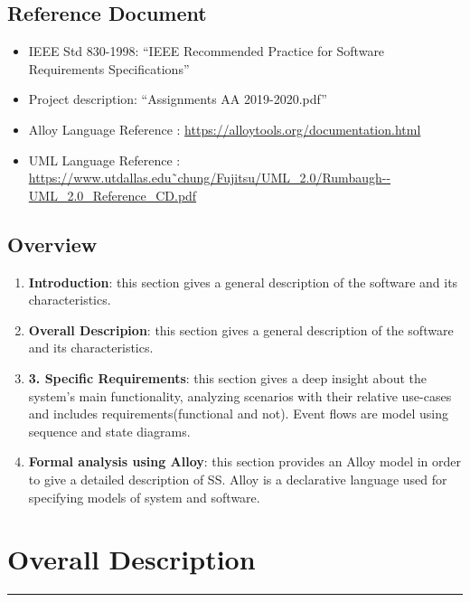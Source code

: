 \documentclass[12pt]{article}
\begin{document}
\subsection{Reference Document}
\vspace{2mm}
\begin{itemize}
\item IEEE Std 830-1998: “IEEE Recommended Practice for Software Requirements Specifications”

\item Project description: “Assignments AA 2019-2020.pdf”
\item Alloy Language Reference : \url{https://alloytools.org/documentation.html}
\item UML Language Reference : \url{https://www.utdallas.edu˜chung/Fujitsu/UML_2.0/Rumbaugh--UML_2.0_Reference_CD.pdf}
\end{itemize}

\subsection{Overview}
\vspace{2mm}
\begin{enumerate}
\item \textbf{Introduction}: this section gives a general description of the software  and its characteristics.

\item \textbf{Overall Descripion}: this section gives a general description of the software  and its characteristics.

\item \textbf{3.	Specific Requirements}: this section gives a deep insight about the system’s main functionality, analyzing scenarios with their relative use-cases and includes requirements(functional and not). Event flows are model using sequence and state diagrams. 

\item \textbf{Formal analysis using Alloy}: this section provides an Alloy model in order to give a detailed description of SS. Alloy is a declarative language used for specifying models of system and software.


\end{enumerate}

\newpage

\section{Overall Description}
\hrule
\vspace{8mm}
\end{document}
